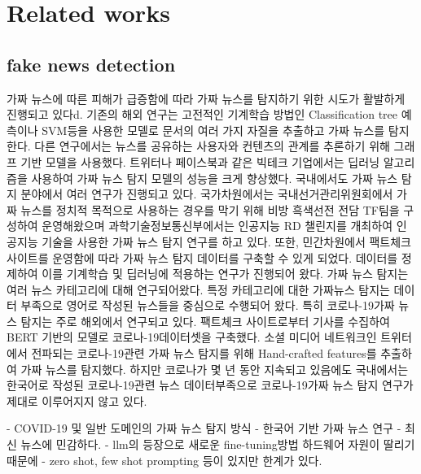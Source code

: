 \documentclass[a4paper,fleqn]{cas-sc}
\begin{document}
\section{Related works}
\subsection{fake news detection}
가짜 뉴스에 따른 피해가 급증함에 따라 가짜 뉴스를 탐지하기 위한 시도가 활발하게 진행되고 있다d. 
기존의 해외 연구는 고전적인 기계학습 방법인 Classification tree 예측이나 SVM등을 사용한 모델로 문서의 여러 가지 자질을 추출하고 가짜 뉴스를 탐지한다. 
다른 연구에서는 뉴스를 공유하는 사용자와 컨텐츠의 관계를 추론하기 위해 그래프 기반 모델을 사용했다. 트위터나 페이스북과 같은 빅테크 기업에서는 딥러닝 알고리즘을 사용하여 가짜 뉴스 탐지 모델의 성능을 크게 향상했다. 
국내에서도 가짜 뉴스 탐지 분야에서 여러 연구가 진행되고 있다. 
국가차원에서는 국내선거관리위원회에서 가짜 뉴스를 정치적 목적으로 사용하는 경우를 막기 위해 비방 흑색선전 전담 TF팀을 구성하여 운영해왔으며 과학기술정보통신부에서는 인공지능 RD 챌린지를 개최하여 인공지능 기술을 사용한 가짜 뉴스 탐지 연구를 하고 있다. 
또한, 민간차원에서 팩트체크 사이트를 운영함에 따라 가짜 뉴스 탐지 데이터를 구축할 수 있게 되었다. 
데이터를 정제하여 이를 기계학습 및 딥러닝에 적용하는 연구가 진행되어 왔다.
가짜 뉴스 탐지는 여러 뉴스 카테고리에 대해 연구되어왔다. 
특정 카테고리에 대한 가짜뉴스 탐지는 데이터 부족으로 영어로 작성된 뉴스들을 중심으로 수행되어 왔다. 특히 코로나-19가짜 뉴스 탐지는 주로 해외에서 연구되고 있다. 팩트체크 사이트로부터 기사를 수집하여 BERT 기반의 모델로 코로나-19데이터셋을 구축했다. 소셜 미디어 네트워크인 트위터에서 전파되는 코로나-19관련 가짜 뉴스 탐지를 위해 Hand-crafted features를 추출하여 가짜 뉴스를 탐지했다. 하지만 코로나가 몇 년 동안 지속되고 있음에도 국내에서는 한국어로 작성된 코로나-19관련 뉴스 데이터부족으로 코로나-19가짜 뉴스 탐지 연구가 제대로 이루어지지 않고 있다.

- COVID-19 및 일반 도메인의 가짜 뉴스 탐지 방식
- 한국어 기반 가짜 뉴스 연구
- 최신 뉴스에 민감하다.
- llm의 등장으로 새로운 fine-tuning방법 하드웨어 자원이 딸리기 때문에
- zero shot, few shot prompting 등이 있지만 한계가 있다.
\end{document}
